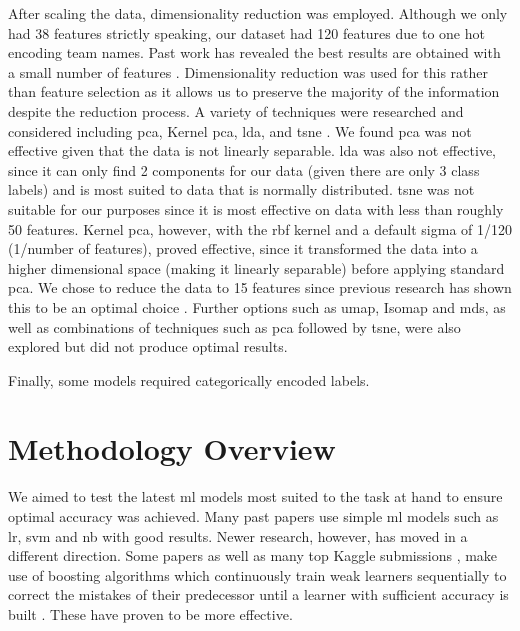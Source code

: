 \documentclass{article}
\begin{document}
After scaling the data, dimensionality reduction was employed. Although we only had 38 features strictly speaking, our dataset had 120 features due to one hot encoding team names. Past work has revealed the best results are obtained with a small number of features \cite{horvat2020use}. Dimensionality reduction was used for this rather than feature selection as it allows us to preserve the majority of the information despite the reduction process. A variety of techniques were researched and considered including \gls{pca}, Kernel \gls{pca}, \gls{lda}, and \gls{tsne} \cite{pramodithamediumdimensionality}. We found \gls{pca} was not effective given that the data is not linearly separable. \gls{lda} was also not effective, since it can only find 2 components for our data (given there are only 3 class labels) and is most suited to data that is normally distributed. \gls{tsne} was not suitable for our purposes since it is most effective on data with less than roughly 50 features. Kernel \gls{pca}, however, with the \gls{rbf} kernel and a default sigma of 1/120 (1/number of features), proved effective, since it transformed the data into a higher dimensional space (making it linearly separable) before applying standard \gls{pca}. We chose to reduce the data to 15 features since previous research has shown this to be an optimal choice \cite{horvat2020use}. Further options such as \gls{umap}, Isomap and \gls{mds}, \cite{sivarajahmediumdimensionality} as well as combinations of techniques such as \gls{pca} followed by \gls{tsne}, were also explored but did not produce optimal results.

Finally, some models required categorically encoded labels. 

\section{Methodology Overview}
\label{methodology}

We aimed to test the latest \gls{ml} models most suited to the task at hand to ensure optimal accuracy was achieved. Many past papers use simple \gls{ml} models such as \gls{lr}, \gls{svm} and \gls{nb} \cite{knoll2020machine, teli2018prediction} with good results. Newer research, however, has moved in a different direction. Some papers \cite{tax2015predicting, buursma2011predicting, hucaljuk2011predicting, raju2020predicting} as well as many top Kaggle submissions \cite{kaggleuddinmatchprediction}, make use of boosting algorithms which continuously train weak learners sequentially to correct the mistakes of their predecessor until a learner with sufficient accuracy is built \cite{souzamediumquickguideboosting}. These have proven to be more effective.  
\end{document}
